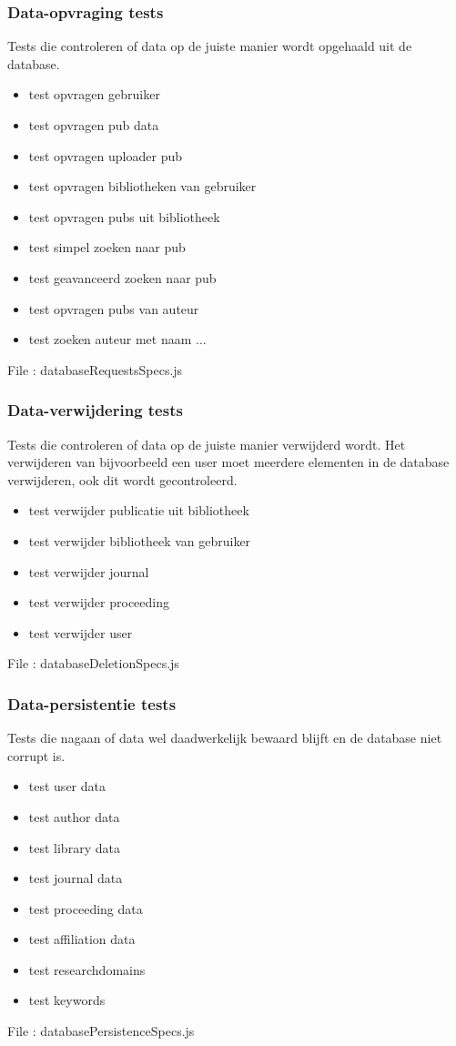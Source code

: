 \documentclass{article}
\begin{document}
\subsubsection{Data-opvraging tests}
Tests die controleren of data op de juiste manier wordt opgehaald uit de database.
\begin{itemize}
\item test opvragen gebruiker
\item test opvragen pub data
\item test opvragen uploader pub
\item test opvragen bibliotheken van gebruiker
\item test opvragen pubs uit bibliotheek
\item test simpel zoeken naar pub
\item test geavanceerd zoeken naar pub
\item test opvragen pubs van auteur
\item test zoeken auteur met naam ...
\end{itemize}
File : databaseRequestsSpecs.js
\subsubsection{Data-verwijdering tests}
Tests die controleren of data op de juiste manier verwijderd wordt. Het verwijderen van bijvoorbeeld een user moet meerdere elementen in de database verwijderen, ook dit wordt gecontroleerd. 
\begin{itemize}
\item test verwijder publicatie uit bibliotheek
\item test verwijder bibliotheek van gebruiker
\item test verwijder journal
\item test verwijder proceeding
\item test verwijder user
\end{itemize}
File : databaseDeletionSpecs.js
\subsubsection{Data-persistentie tests}
Tests die nagaan of data wel daadwerkelijk bewaard blijft en de database niet corrupt is.
\begin{itemize}
\item test user data
\item test author data
\item test library data
\item test journal data
\item test proceeding data
\item test affiliation data
\item test researchdomains
\item test keywords
\end{itemize}
File : databasePersistenceSpecs.js
\end{document}
